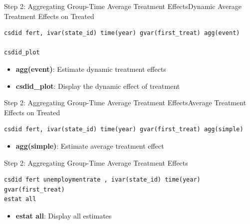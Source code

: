 \documentclass[dvipsnames,hyperref={pdfpagelabels=false}]{beamer}
\begin{document}
\begin{frame}[fragile]{Step 2: Aggregating Group-Time Average Treatment Effects}{Dynamic Average Treatment Effects on Treated}
\begin{lstlisting}
csdid fert, ivar(state_id) time(year) gvar(first_treat) agg(event)

csdid_plot
\end{lstlisting}	
	
	
	\begin{itemize}
		\vspace{0.2cm}
		\item \textbf{agg(event)}: Estimate dynamic treatment effects			
		\vspace{0.2cm}
		\item \textbf{csdid\_plot}: Display the dynamic effect of treatment
	\end{itemize}
	
	
	
	
\end{frame}


\begin{frame}[fragile]{Step 2: Aggregating Group-Time Average Treatment Effects}{Average Treatment Effects on Treated}
\begin{lstlisting}
csdid fert, ivar(state_id) time(year) gvar(first_treat) agg(simple)
\end{lstlisting}	
	
	
	\begin{itemize}
		\vspace{0.2cm}
		\item \textbf{agg(simple)}: Estimate average treatment effect			
	\end{itemize}
	
	
	
	
\end{frame}



\begin{frame}[fragile]{Step 2: Aggregating Group-Time Average Treatment Effects}
\begin{lstlisting}
csdid fert unemploymentrate , ivar(state_id) time(year) gvar(first_treat)
estat all
\end{lstlisting}	
	
	
	\begin{itemize}
		\vspace{0.2cm}
		\item \textbf{estat all}: Display all estimates		
	\end{itemize}
	
	
	
	
\end{frame}
\end{document}
